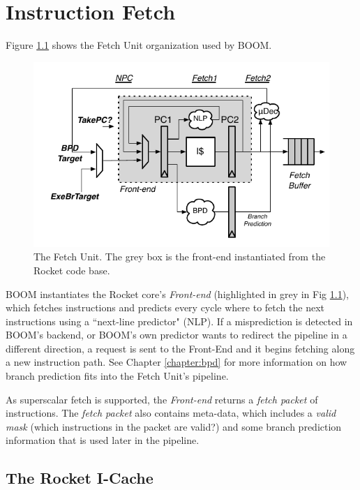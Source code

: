 \chapter {Instruction Fetch}

Figure \ref{fig:fetch} shows the Fetch Unit organization used by BOOM. 

\begin{figure}[ht]
	\centering
	\centerline{\includegraphics[scale =1] {figures/frontend}}
	\caption{ \small The Fetch Unit. The grey box is the front-end instantiated from the Rocket code base.}
	\label{fig:fetch}
\end{figure}

BOOM instantiates the Rocket core's {\em Front-end} (highlighted in grey in Fig \ref{fig:fetch}), which fetches instructions and predicts every cycle where to fetch the next instructions using a ``next-line predictor" (NLP). If a misprediction is detected in BOOM's backend, or BOOM's own predictor wants to redirect the pipeline in a different direction, a request is sent to the Front-End and it begins fetching along a new instruction path.  See Chapter \ref{chapter:bpd} for more information on how branch prediction fits into the Fetch Unit's pipeline. 

As superscalar fetch is supported, the {\em Front-end} returns a {\em fetch packet} of instructions.  The {\em fetch packet} also contains meta-data, which includes a {\em valid mask} (which instructions in the packet are valid?) and some branch prediction information that is used later in the pipeline. 

\section{The Rocket I-Cache}

